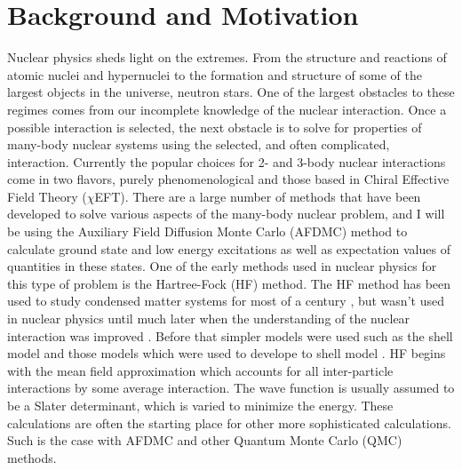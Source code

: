 \chapter{Background and Motivation}
Nuclear physics sheds light on the extremes. From the structure and reactions of atomic nuclei and hypernuclei to the formation and structure of some of the largest objects in the universe, neutron stars. One of the largest obstacles to these regimes comes from our incomplete knowledge of the nuclear interaction. Once a possible interaction is selected, the next obstacle is to solve for properties of many-body nuclear systems using the selected, and often complicated, interaction. Currently the popular choices for 2- and 3-body nuclear interactions come in two flavors, purely phenomenological and those based in Chiral Effective Field Theory ($\chi$EFT). There are a large number of methods that have been developed to solve various aspects of the many-body nuclear problem, and I will be using the Auxiliary Field Diffusion Monte Carlo (AFDMC) method to calculate ground state and low energy excitations as well as expectation values of quantities in these states. One of the early methods used in nuclear physics for this type of problem is the Hartree-Fock (HF) method. The HF method has been used to study condensed matter systems for most of a century \cite{hartree1928, fock1930, slater1951}, but wasn't used in nuclear physics until much later when the understanding of the nuclear interaction was improved \cite{zofka1970, gogny1986}. Before that simpler models were used such as the shell model and those models which were used to develope to shell model \cite{mayer1950_1,mayer1950_2}. HF begins with the mean field approximation which accounts for all inter-particle interactions by some average interaction. The wave function is usually assumed to be a Slater determinant, which is varied to minimize the energy. These calculations are often the starting place for other more sophisticated calculations. Such is the case with AFDMC and other Quantum Monte Carlo (QMC) methods.

